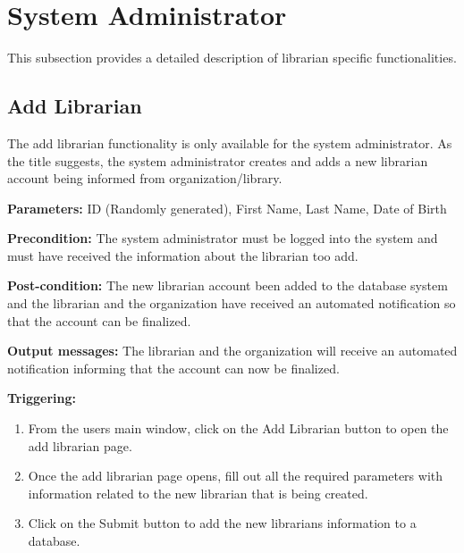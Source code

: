 \section{System Administrator}
\label{operation:System Administrator}

This subsection provides a detailed description of librarian specific
functionalities.

\subsection{Add Librarian}

The add librarian functionality is only available for the system administrator. As the title suggests, the system administrator creates and adds a new librarian account being informed from organization/library. 

\begin{description}

\item \textbf{Parameters:} ID (Randomly generated), First Name, Last Name, Date of Birth

\item \textbf{Precondition:} The system administrator must be logged into the system and must have received the information about the librarian too add. 

\item \textbf{Post-condition:} The new librarian account been added to the database system and the librarian and the organization have received an automated notification so that the account can be finalized. 

\item \textbf{Output messages:} The librarian and the organization will receive an automated notification informing that the account can now be finalized. 

\item \textbf{Triggering:}
\begin{enumerate}

\item From the users main window, click on the Add Librarian button to open the
add librarian page.

\item Once the add librarian page opens, fill out all the required parameters with information related to the new librarian that is being created. 

\item Click on the Submit button to add the new librarians
information to a database.

\end{enumerate}

\end{description}


